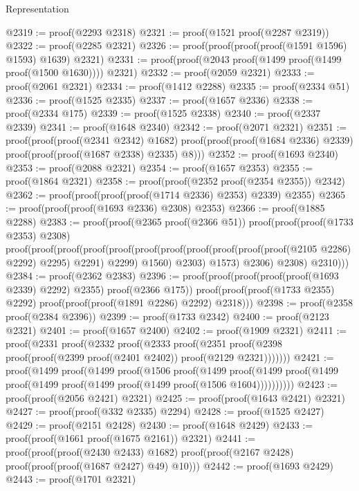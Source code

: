 \begin{lexlean}{Representation}
\begin{coremodule}
@2319 := proof(@2293 @2318)
@2321 := proof(@1521 proof(@2287 @2319))
@2322 := proof(@2285 @2321)
@2326 := proof(proof(proof(proof(@1591 @1596) @1593) @1639) @2321)
@2331 := proof(proof(@2043 proof(@1499 proof(@1499 proof(@1500 @1630)))) @2321)
@2332 := proof(@2059 @2321)
@2333 := proof(@2061 @2321)
@2334 := proof(@1412 @2288)
@2335 := proof(@2334 @51)
@2336 := proof(@1525 @2335)
@2337 := proof(@1657 @2336)
@2338 := proof(@2334 @175)
@2339 := proof(@1525 @2338)
@2340 := proof(@2337 @2339)
@2341 := proof(@1648 @2340)
@2342 := proof(@2071 @2321)
@2351 := proof(proof(proof(@2341 @2342) @1682)
      proof(proof(proof(@1684 @2336) @2339) proof(proof(proof(@1687 @2338) @2335) @8)))
@2352 := proof(@1693 @2340)
@2353 := proof(@2088 @2321)
@2354 := proof(@1657 @2353)
@2355 := proof(@1864 @2321)
@2358 := proof(proof(@2352 proof(@2354 @2355)) @2342)
@2362 := proof(proof(proof(proof(@1714 @2336) @2353) @2339) @2355)
@2365 := proof(proof(proof(@1693 @2336) @2308) @2353)
@2366 := proof(@1885 @2288)
@2383 := proof(proof(@2365 proof(@2366 @51))
      proof(proof(proof(@1733 @2353) @2308)
          proof(proof(proof(proof(proof(proof(proof(proof(proof(proof(proof(@2105 @2286) @2292)
                              @2295)
                            @2291)
                          @2299)
                        @1560)
                      @2303)
                    @1573)
                  @2306)
                @2308)
              @2310)))
@2384 := proof(@2362 @2383)
@2396 := proof(proof(proof(proof(proof(@1693 @2339) @2292) @2355) proof(@2366 @175))
      proof(proof(proof(@1733 @2355) @2292) proof(proof(proof(@1891 @2286) @2292) @2318)))
@2398 := proof(@2358 proof(@2384 @2396))
@2399 := proof(@1733 @2342)
@2400 := proof(@2123 @2321)
@2401 := proof(@1657 @2400)
@2402 := proof(@1909 @2321)
@2411 := proof(@2331
      proof(@2332
          proof(@2333
              proof(@2351 proof(@2398 proof(proof(@2399 proof(@2401 @2402)) proof(@2129 @2321)))))))
@2421 := proof(@1499
      proof(@1499
          proof(@1506
              proof(@1499
                  proof(@1499
                      proof(@1499 proof(@1499 proof(@1499 proof(@1499 proof(@1506 @1604))))))))))
@2423 := proof(proof(@2056 @2421) @2321)
@2425 := proof(proof(@1643 @2421) @2321)
@2427 := proof(proof(@332 @2335) @2294)
@2428 := proof(@1525 @2427)
@2429 := proof(@2151 @2428)
@2430 := proof(@1648 @2429)
@2433 := proof(proof(@1661 proof(@1675 @2161)) @2321)
@2441 := proof(proof(proof(@2430 @2433) @1682)
      proof(proof(@2167 @2428) proof(proof(proof(@1687 @2427) @49) @10)))
@2442 := proof(@1693 @2429)
@2443 := proof(@1701 @2321)

\end{coremodule}
\end{lexlean}
